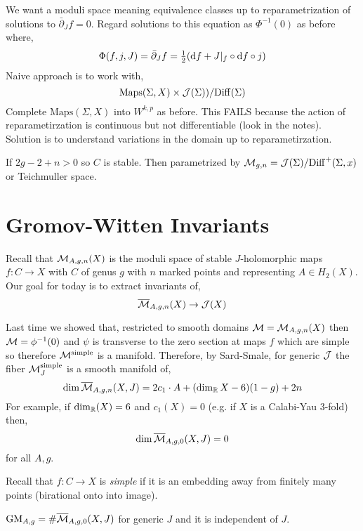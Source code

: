 \documentclass[12pt]{article}
\newcommand{\dbar}{\bar{\partial}}
\begin{document}
We want a moduli space meaning equivalence classes up to reparametrization of solutions to $\dbar_J f = 0$. Regard solutions to this equation as $\Phi^{-1}(0)$ as before where,
\[ \Phi(f, j, J) = \dbar_J f = \tfrac{1}{2} (\d{f} + J|_f \circ \d{f} \circ j) \]
Naive approach is to work with,
\[ \mathrm{Maps}(\Sigma, X) \times \mathcal{J}(\Sigma)) / \mathrm{Diff}(\Sigma) \]
Complete $\mathrm{Maps}(\Sigma, X)$ into $W^{k,p}$ as before. This FAILS because the action of reparametirzation is continuous but not differentiable (look in the notes).
\bigskip\\
Solution is to understand variations in the domain up to reparametirzation. 

\begin{example}
If $2g - 2 +n > 0$ so $C$ is stable. Then parametrized by $\mathcal{M}_{g,n} = \mathcal{J}(\Sigma) / \mathrm{Diff}^+(\Sigma, x)$ or Teichmuller space.
\end{example}

\section{Gromov-Witten Invariants}

Recall that $\mathcal{M}_{A,g,n}(X)$ is the moduli space of stable $J$-holomorphic maps $f : C \to X$ with $C$ of genus $g$ with $n$ marked points and representing $A \in H_2(X)$. Our goal for today is to extract invariants of,
\[ \overline{\mathcal{M}}_{A,g,n}(X) \to \mathcal{J}(X) \]

Last time we showed that, restricted to smooth domains $\mathcal{M} = \mathcal{M}_{A,g,n}(X)$ then $\mathcal{M} = \phi^{-1}(0)$ and $\psi$ is transverse to the zero section at maps $f$ which are simple so therefore $\mathcal{M}^{\text{simple}}$ is a manifold. Therefore, by Sard-Smale, for generic $\mathcal{J}$ the fiber $\mathcal{M}_J^{\text{simple}}$ is a smooth manifold of,
\[ \dim{\overline{\mathcal{M}}_{A,g,n}(X,J)} = 2 c_1 \cdot A + (\dim_{\mathbb{R}}{X} - 6)(1 - g) + 2 n \]
For example, if $\dim_{\mathbb{R}}(X) = 6$ and $c_1(X) = 0$ (e.g. if $X$ is a Calabi-Yau 3-fold) then,
\[ \dim{\overline{\mathcal{M}}_{A,g,0}}(X, J) = 0 \]
for all $A,g$. 

\begin{rmk}
Recall that $f : C \to X$ is \textit{simple} if it is an embedding away from finitely many points (birational onto into image). 
\end{rmk}

\newcommand{\GM}{\mathrm{GM}}

\begin{defn}
$\GM_{A,g} = \# \Mbar_{A,g,0}(X,J)$ for generic $J$ and it is independent of $J$. 
\end{defn}
\end{document}

